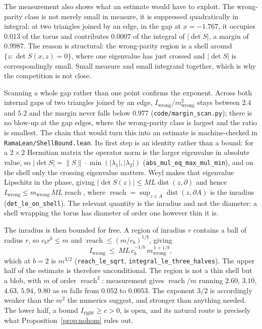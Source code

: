 \documentclass[11pt]{article}
\theoremstyle{remark}
\begin{document}
The measurement also shows what an estimate would have to exploit. The wrong-parity class
is not merely small in measure, it is suppressed quadratically in integral: at two triangles
joined by an edge, in the gap at $x=-1.767$, it occupies $0.013$ of the torus and
contributes $0.0007$ of the integral of $|\det S|$, a margin of $0.9987$. The reason is
structural: the wrong-parity region is a shell around $\{z:\det S(x,z)=0\}$, where one
eigenvalue has just crossed and $|\det S|$ is correspondingly small. Small measure and small
integrand together, which is why the competition is not close.

Scanning a whole gap rather than one point confirms the exponent. Across both internal gaps
of two triangles joined by an edge, $I_{\mathrm{wrong}}/m_{\mathrm{wrong}}^2$ stays between
$2.4$ and $5.2$ and the margin never falls below $0.977$
(\texttt{code/margin\_scan.py}); there is no blow-up at the gap edges, where the
wrong-parity class is largest and the ratio is smallest. The chain that would turn this into
an estimate is machine-checked in \texttt{RamaLean/ShellBound.lean}. Its first step is an
identity rather than a bound: for a $2\times2$ Hermitian matrix the operator norm is the
larger eigenvalue in absolute value, so
$|\det S|=\lVert S\rVert\cdot\min(|\lambda_1|,|\lambda_2|)$
(\texttt{abs\_mul\_eq\_max\_mul\_min}), and on the shell only the crossing eigenvalue
matters. Weyl makes that eigenvalue Lipschitz in the phase, giving
$|\det S(z)|\le ML\operatorname{dist}(z,\partial)$ and hence
$I_{\mathrm{wrong}}\le m_{\mathrm{wrong}}\,ML\operatorname{reach}$, where
$\operatorname{reach}=\sup_{z\in A}\operatorname{dist}(z,\partial A)$ is the inradius
(\texttt{det\_le\_on\_shell}). The relevant quantity is the inradius and not the diameter: a
shell wrapping the torus has diameter of order one however thin it is.

The inradius is then bounded for free. A region of inradius $r$ contains a ball of radius
$r$, so $c_br^b\le m$ and $\operatorname{reach}\le(m/c_b)^{1/b}$, giving
\[
   I_{\mathrm{wrong}}\ \le\ ML\,c_b^{-1/b}\,m_{\mathrm{wrong}}^{\,1+1/b},
\]
which at $b=2$ is $m^{3/2}$ (\texttt{reach\_le\_sqrt},
\texttt{integral\_le\_three\_halves}). The upper half of the estimate is therefore
unconditional. The region is not a thin shell but a blob, with $m$ of order
$\operatorname{reach}^2$: measurement gives $\operatorname{reach}/m$ running $2.60$, $3.10$,
$4.63$, $5.94$, $9.80$ as $m$ falls from $0.052$ to $0.0053$. The exponent $3/2$ is accordingly
weaker than the $m^2$ the numerics suggest, and stronger than anything needed. The lower half, a bound $I_{\mathrm{right}}\ge c>0$, is open, and
its natural route is precisely what Proposition~\ref{prop:nohom} rules out.
\end{document}
